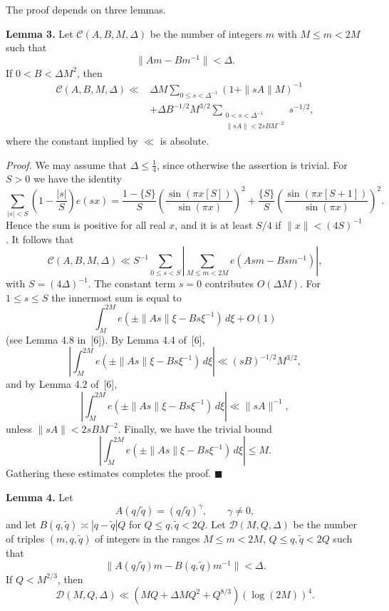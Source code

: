 \documentclass[10pt]{article}
\begin{document}
The proof depends on three lemmas.

\medskip
\noindent\textbf{Lemma 3.}
Let $\mathscr C(A,B,M,\Delta)$ be the number of integers $m$ with
$M\le m<2M$ such that
\[
  \|Am-Bm^{-1}\|<\Delta.
\]
If $0<B<\Delta M^2$, then
\[
  \begin{aligned}
  \mathscr C(A,B,M,\Delta)\ll{}&
  \Delta M\sum_{0\le s<\Delta^{-1}}(1+\|sA\|M)^{-1}\\
  &+\Delta B^{-1/2}M^{3/2}
  \sum_{\substack{0<s<\Delta^{-1}\\
                   \|sA\|<2sBM^{-2}}}s^{-1/2},
  \end{aligned}
\]
where the constant implied by $\ll$ is absolute.

\medskip
\noindent\textit{Proof.}
We may assume that $\Delta\le\frac14$, since otherwise the assertion is
trivial. For $S>0$ we have the identity
\[
  \sum_{|s|<S}\left(1-\frac{|s|}{S}\right)e(sx)
  =\frac{1-\{S\}}{S}\left(\frac{\sin(\pi x[S])}{\sin(\pi x)}\right)^2
  +\frac{\{S\}}{S}\left(\frac{\sin(\pi x[S+1])}{\sin(\pi x)}\right)^2.
\]
Hence the sum is positive for all real $x$, and it is at least $S/4$ if
$\|x\|<(4S)^{-1}$. It follows that
\[
  \mathscr C(A,B,M,\Delta)
  \ll S^{-1}\sum_{0\le s<S}
  \left|\sum_{M\le m<2M}e(Asm-Bsm^{-1})\right|,
\]
with $S=(4\Delta)^{-1}$. The constant term $s=0$ contributes
$O(\Delta M)$. For $1\le s\le S$ the innermost sum is equal to
\[
  \int_M^{2M}e(\pm\|As\|\xi-Bs\xi^{-1})\,d\xi+O(1)
\]
(see Lemma 4.8 in~[6]). By Lemma 4.4 of~[6],
\[
  \left|\int_M^{2M}e(\pm\|As\|\xi-Bs\xi^{-1})\,d\xi\right|
  \ll(sB)^{-1/2}M^{3/2},
\]
and by Lemma 4.2 of~[6],
\[
  \left|\int_M^{2M}e(\pm\|As\|\xi-Bs\xi^{-1})\,d\xi\right|
  \ll\|sA\|^{-1},
\]
unless $\|sA\|<2sBM^{-2}$. Finally, we have the trivial bound
\[
  \left|\int_M^{2M}e(\pm\|As\|\xi-Bs\xi^{-1})\,d\xi\right|\le M.
\]
Gathering these estimates completes the proof. \(\blacksquare\)

\medskip
\noindent\textbf{Lemma 4.}
Let
\[
  A(q/\widetilde q)=(q/\widetilde q)^\gamma,\qquad \gamma\ne0,
\]
and let $B(q,\widetilde q)\asymp|q-\widetilde q|Q$ for
$Q\le q,\widetilde q<2Q$. Let $\mathscr D(M,Q,\Delta)$ be the number of
triples $(m,q,\widetilde q)$ of integers in the ranges
$M\le m<2M$, $Q\le q,\widetilde q<2Q$ such that
\[
  \|A(q/\widetilde q)m-B(q,\widetilde q)m^{-1}\|<\Delta.
\]
If $Q<M^{2/3}$, then
\[
  \mathscr D(M,Q,\Delta)
  \ll\left(MQ+\Delta MQ^2+Q^{8/3}\right)(\log(2M))^4.
\]
\end{document}
